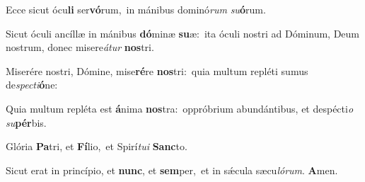 Ecce sicut ócu\textbf{li} ser\textbf{vó}rum,~\redgreheightstar in mánibus dominó\textit{rum} \textit{su}\textbf{ó}rum.

Sicut óculi ancíllæ in mánibus \textbf{dó}minæ \textbf{su}æ:~\redgreheightstar ita óculi nostri ad Dóminum, Deum nostrum, donec misere\textit{á}\textit{tur} \textbf{nos}tri.

Miserére nostri, Dómine, mise\textbf{ré}re \textbf{nos}tri:~\redgreheightstar quia multum repléti sumus de\textit{spec}\textit{ti}\textbf{ó}ne:

Quia multum repléta est \textbf{á}nima \textbf{nos}tra:~\redgreheightstar oppróbrium abundántibus, et despécti\textit{o} \textit{su}\textbf{pér}bis.

Glória \textbf{Pa}tri, et \textbf{Fí}lio,~\redgreheightstar et Spirí\textit{tu}\textit{i} \textbf{Sanc}to.

Sicut erat in princípio, et \textbf{nunc}, et \textbf{sem}per,~\redgreheightstar et in sǽcula sæcu\textit{ló}\textit{rum}. \textbf{A}men.

